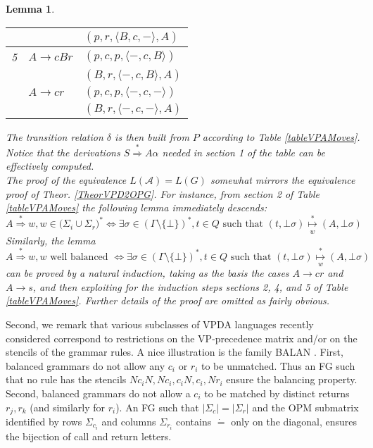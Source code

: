 \documentclass[3p,11pt]{elsarticle}
\newtheorem{lemma}[theorem]{Lemma}
\newenvironment{proof}[1][Proof]{\begin{trivlist}
\item[\hskip \labelsep {\bfseries #1}]}{\end{trivlist}}
\begin{document}
\begin{lemma}
\begin{proof}
\begin{table}[h!]
\begin{center}
\begin{tabular}{|l|p{4cm}|p{5cm}|}
                  && $(p, r,  \langle B,c,- \rangle, A)$
  \\
  \hline
  5& $A\to c B  r$ & $(p, c, p, \langle -,c,B \rangle )$
  \\
                  && $(B, r,  \langle -,c,B \rangle, A)$
  \\
  &  $A\to c r$ & $(p, c, p, \langle -,c,- \rangle )$
  \\
                  && $(B, r,  \langle -,c,- \rangle, A)$
  \\  \hline
\end{tabular}
\end{center}
\end{table}
The transition relation $\delta$ is then built from $P$ according to Table \ref{tableVPAMoves}. Notice that the derivations $S\stackrel{\ast}{\Rightarrow} A \alpha$ needed in section 1 of the table can be effectively computed.
\\
The proof of the equivalence $L(\mathcal{A})=L(G)$ somewhat mirrors the equivalence proof of Theor. \ref{TheorVPD2OPG}. For instance, from  section 2 of Table \ref{tableVPAMoves} the following lemma immediately descends:
$$
A\stackrel{\ast}{\Rightarrow}w, w \in \big( \Sigma_i \cup \Sigma_r\big)^\ast \iff \exists \sigma \in (\Gamma \setminus \{\bot\})^\ast , t \in Q \text{ such that } (t, \bot \sigma) \underset{w}{\stackrel*\mapsto} (A, \bot\sigma)
$$
Similarly, the lemma
$$
A\stackrel{\ast}{\Rightarrow}w, w \text{ well balanced } \iff \exists  \sigma \in (\Gamma \setminus \{\bot\})^\ast , t \in Q \text{ such that } (t, \bot \sigma) \underset{w}{\stackrel*\mapsto} (A, \bot\sigma)
$$
can be proved by a natural induction, taking as the basis the cases $A\to cr$ and $A\to s$, and then exploiting for the induction steps sections 2, 4, and 5  of Table \ref{tableVPAMoves}. Further details of the proof are omitted as fairly obvious.
\end{proof}
\end{lemma}
Second, we remark that various subclasses of VPDA languages recently considered correspond to restrictions on the VP-precedence matrix and/or on the stencils of the grammar rules. A nice illustration is the family BALAN \cite{Berstel:2001:BGT}. First, balanced grammars do not allow  any $c_i$ or $r_i$ to be unmatched. Thus an FG such that no rule has the stencils $Nc_iN, Nc_i, c_iN, c_i, Nr_i$ ensure the balancing property. Second, balanced grammars do not allow a $c_i$ to be matched by distinct returns $r_j,r_k$ (and similarly for $r_i$). An FG such that $|\Sigma_c|=|\Sigma_r|$ and the OPM submatrix identified by rows $\Sigma_{c_i}$ and columns $\Sigma_{r_i}$ contains $\dot=$ only on the diagonal, ensures the bijection of call and return letters.
\end{document}

